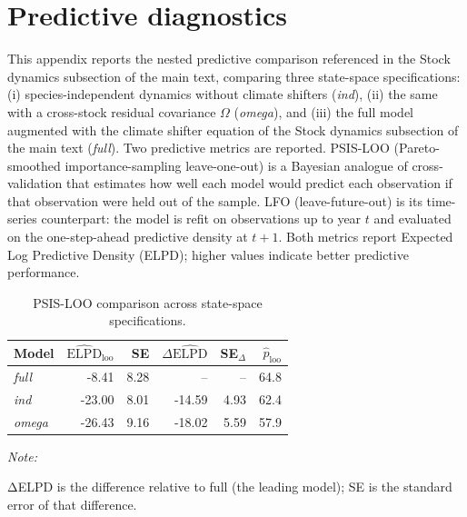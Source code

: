 \documentclass[
  11pt,
]{article}
\begin{document}
\section{Predictive diagnostics}\label{appendix-predictive}

This appendix reports the nested predictive comparison referenced in
the Stock dynamics subsection of the main text, comparing three state-space
specifications: (i) species-independent dynamics without climate
shifters (\emph{ind}), (ii) the same with a cross-stock residual
covariance \(\Omega\) (\emph{omega}), and (iii) the full model
augmented with the climate shifter equation of the Stock dynamics subsection of the main text
(\emph{full}). Two predictive metrics are reported. PSIS-LOO
(Pareto-smoothed importance-sampling leave-one-out) is a Bayesian
analogue of cross-validation that estimates how well each model would
predict each observation if that observation were held out of the
sample. LFO (leave-future-out) is its time-series counterpart: the
model is refit on observations up to year \(t\) and evaluated on the
one-step-ahead predictive density at \(t+1\). Both metrics report
Expected Log Predictive Density (ELPD); higher values indicate better
predictive performance.

\begin{table}[!h]
\centering
\caption{\label{tab:loo-appendix-table}PSIS-LOO comparison across state-space specifications. \label{tab:loo-appendix}}
\centering
\fontsize{10}{12}\selectfont
\begin{threeparttable}
\begin{tabular}[t]{lrrrrr}
\toprule
Model & $\widehat{\text{ELPD}}_{\text{loo}}$ & SE & $\Delta\widehat{\text{ELPD}}$ & SE$_{\Delta}$ & $\hat{p}_{\text{loo}}$\\
\midrule
\emph{full} & -8.41 & 8.28 & -- & -- & 64.8\\
\emph{ind} & -23.00 & 8.01 & -14.59 & 4.93 & 62.4\\
\emph{omega} & -26.43 & 9.16 & -18.02 & 5.59 & 57.9\\
\bottomrule
\end{tabular}
\begin{tablenotes}
\item \textit{Note:} 
\item ΔELPD is the difference relative to full (the leading model); SE is the standard error of that difference.
\end{tablenotes}
\end{threeparttable}
\end{table}
\end{document}
